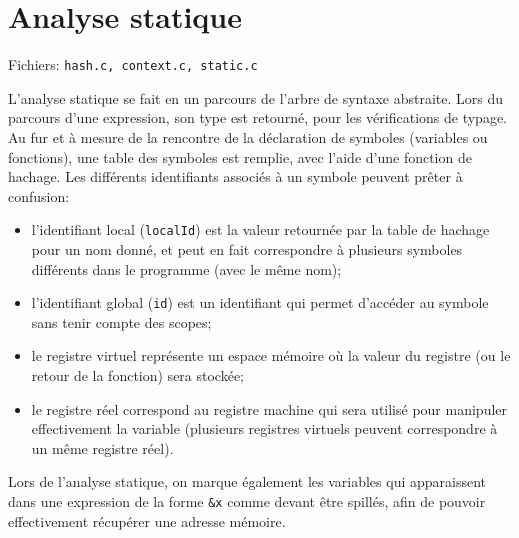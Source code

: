 \documentclass{article}
\begin{document}
	\section{Analyse statique}
		\par Fichiers: \verb#hash.c, context.c, static.c#
		\par L'analyse statique se fait en un parcours de l'arbre de syntaxe abstraite. Lors du parcours d'une expression, son type est retourné, pour les vérifications de typage. Au fur et à mesure de la rencontre de la déclaration de symboles (variables ou fonctions), une table des symboles est remplie, avec l'aide d'une fonction de hachage. Les différents identifiants associés à un symbole peuvent prêter à confusion:
		\begin{itemize}
			\item l'identifiant local (\verb#localId#) est la valeur retournée par la table de hachage pour un nom donné, et peut en fait correspondre à plusieurs symboles différents dans le programme (avec le même nom);
			\item l'identifiant global (\verb#id#) est un identifiant qui permet d'accéder au symbole sans tenir compte des scopes;
			\item le registre virtuel représente un espace mémoire où la valeur du registre (ou le retour de la fonction) sera stockée;
			\item le registre réel correspond au registre machine qui sera utilisé pour manipuler effectivement la variable (plusieurs registres virtuels peuvent correspondre à un même registre réel).
		\end{itemize}
		\par Lors de l'analyse statique, on marque également les variables qui apparaissent dans une expression de la forme \verb#&x# comme devant être spillés, afin de pouvoir effectivement récupérer une adresse mémoire.
\end{document}
